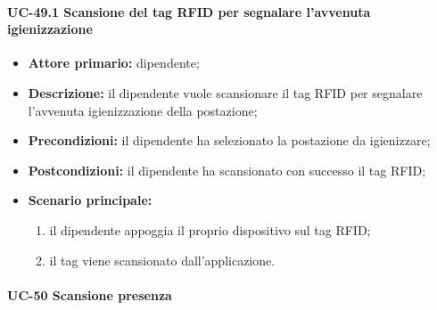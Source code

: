 \paragraph{UC-49.1 Scansione del tag RFID per segnalare l'avvenuta igienizzazione}
    
    \begin{itemize}
        \item \textbf{Attore primario:} dipendente;

        \item \textbf{Descrizione:} il dipendente vuole scansionare il tag RFID per segnalare l'avvenuta igienizzazione della postazione;

        \item \textbf{Precondizioni:} il dipendente ha selezionato la postazione da igienizzare;

        \item \textbf{Postcondizioni:} il dipendente ha scansionato con successo il tag RFID;

        \item \textbf{Scenario principale:}
            \begin{enumerate}
                \item il dipendente appoggia il proprio dispositivo sul tag RFID;
                \item il tag viene scansionato dall'applicazione.
            \end{enumerate}
    \end{itemize} 

\paragraph{UC-50 Scansione presenza}

